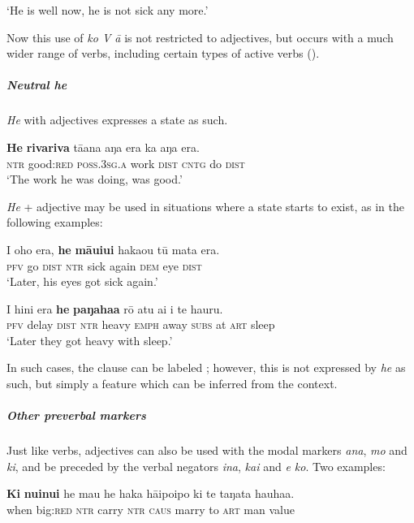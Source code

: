 \glt
‘He is well now, he is not sick any more.’ \textstyleExampleref{[R103.234]} 
\z

Now this use of \textit{ko V {\ꞌ}ā} is not restricted to adjectives, but occurs with a much wider range of verbs, including certain types of active verbs ().

\subparagraph{Neutral \textit{he}} \textit{He} with adjectives expresses a state as such. 

\ea\label{ex:3.102}
\gll \textbf{He} \textbf{rivariva} tā{\ꞌ}ana aŋa era ka aŋa era.\\
\textsc{ntr} good:\textsc{red} \textsc{poss.3sg.a} work \textsc{dist} \textsc{cntg} do \textsc{dist}\\

\glt
‘The work he was doing, was good.’ \textstyleExampleref{[R313.116]} 
\z

\textit{He} + adjective may be used in situations where a state starts to exist, as in the following examples:

\ea\label{ex:3.103}
\gll I oho era, \textbf{he} \textbf{māuiui} haka{\ꞌ}ou tū mata era.\\
\textsc{pfv} go \textsc{dist} \textsc{ntr} sick again \textsc{dem} eye \textsc{dist}\\

\glt 
‘Later, his eyes got sick again.’ \textstyleExampleref{[R237.084]} 
\z

\ea\label{ex:3.104}
\gll I hini era \textbf{he} \textbf{paŋaha{\ꞌ}a} rō atu {\ꞌ}ai {\ꞌ}i te ha{\ꞌ}uru. \\
\textsc{pfv} delay \textsc{dist} \textsc{ntr} heavy \textsc{emph} away \textsc{subs} at \textsc{art} sleep \\

\glt
‘Later they got heavy with sleep.’ \textstyleExampleref{[R536.027]} 
\z

In such cases, the clause can be labeled ; however, this is not expressed by \textit{he} as such, but simply a feature which can be inferred from the context.

\subparagraph{Other preverbal markers} Just like verbs, adjectives can also be used with the modal markers \textit{ana}, \textit{mo} and \textit{ki}, and be preceded by the verbal negators \textit{{\ꞌ}ina}, \textit{kai} and \textit{e ko}. Two examples:

\ea\label{ex:3.105}
\gll \textbf{Ki} \textbf{nuinui} he ma{\ꞌ}u he haka hāipoipo ki te taŋata hauha{\ꞌ}a.\\
when big:\textsc{red} \textsc{ntr} carry \textsc{ntr} \textsc{caus} marry to \textsc{art} man value\\

